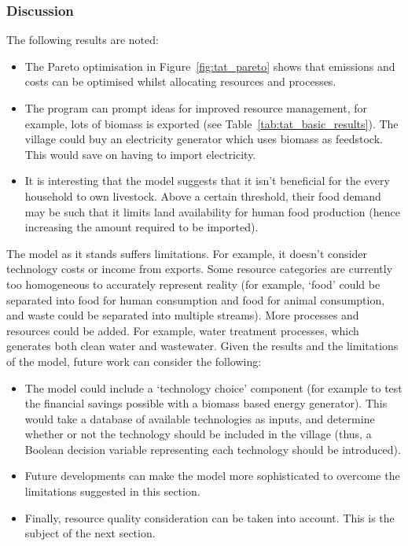 \subsubsection*{Discussion}
The following results are noted:
\begin{itemize}
	\item The Pareto optimisation in Figure~\ref{fig:tat_pareto} shows that emissions and costs can be optimised whilst allocating resources and processes.
	\item The program can prompt ideas for improved resource management, for example, lots of biomass is exported (see Table~\ref{tab:tat_basic_results}). The village could buy an electricity generator which uses biomass as feedstock. This would save on having to import electricity.
	\item It is interesting that the model suggests that it isn't beneficial for the every household to own livestock. Above a certain threshold, their food demand may be such that it limits land availability for human food production (hence increasing the amount required to be imported).
\end{itemize}	
The model as it stands suffers limitations. For example, it doesn't consider technology costs or income from exports. Some resource categories are currently too homogeneous to accurately represent reality (for example, `food' could be separated into food for human consumption and food for animal consumption, and waste could be separated into multiple streams). More processes and resources could be added. For example, water treatment processes, which generates both clean water and wastewater. Given the results and the limitations of the model, future work can consider the following:
\begin{itemize}
	\item The model could include a `technology choice' component (for example to test the financial savings possible with a biomass based energy generator). This would take a database of available technologies as inputs, and determine whether or not the technology should be included in the village (thus, a Boolean decision variable representing each technology should be introduced).
	\item Future developments can make the model more sophisticated to overcome the limitations suggested in this section.
	\item Finally, resource quality consideration can be taken into account. This is the subject of the next section.
\end{itemize}

